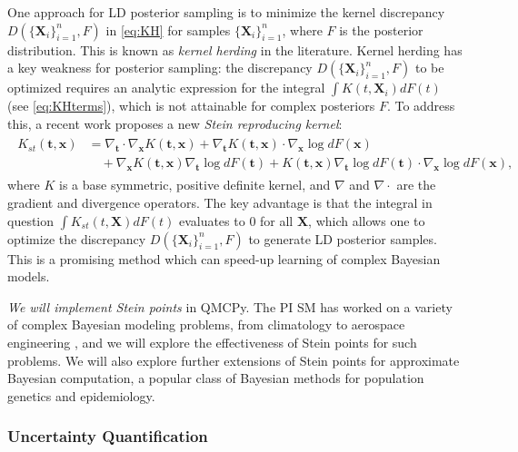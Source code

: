 \documentclass[11pt]{NSFamsart}
\newcommand{\bt}{{\boldsymbol{t}}}
\newcommand{\bx}{{\boldsymbol{x}}}
\newcommand{\bX}{{\boldsymbol{X}}}
\begin{document}
One approach for LD posterior sampling is to minimize the kernel discrepancy $D(\{\bX_i\}_{i=1}^n, F)$ in \eqref{eq:KH} for samples $\{\bX_i\}_{i=1}^n$, where $F$ is the posterior distribution. This is known as \textit{kernel herding} \citep{chen2012super} in the literature. Kernel herding has a key weakness for posterior sampling: the discrepancy $D(\{\bX_i\}_{i=1}^n, F)$ to be optimized requires an analytic expression for the integral $\int K(t,\bX_i) dF(t)$ (see \eqref{eq:KHterms}), which is not attainable for complex posteriors $F$. To address this, a recent work \cite{chen2018stein} proposes a new \textit{Stein reproducing kernel}:
\begin{align}\begin{split} \label{eq:stein}
K_{st}(\bt,\bx) &= \nabla_\bt \cdot \nabla_\bx K(\bt,\bx) + \nabla_\bt K(\bt,\bx) \cdot \nabla_\bx \log dF(\bx)\\
& \quad + \nabla_\bx K(\bt,\bx) \nabla_\bt \log dF(\bt) + K(\bt,\bx) \nabla_\bt \log dF(\bt) \cdot \nabla_\bx \log dF(\bx),
\end{split}\end{align}
where $K$ is a base symmetric, positive definite kernel, and $\nabla$ and $\nabla \cdot$ are the gradient and divergence operators. The key advantage is that the integral in question $\int K_{st}(t,\bX) dF(t)$ evaluates to 0 for all $\bX$, which allows one to optimize the discrepancy $D(\{\bX_i\}_{i=1}^n, F)$ to generate LD posterior samples. This is a promising method which can speed-up learning of complex Bayesian models.

\textit{We will implement Stein points} in QMCPy. The PI \hypertarget{SMlink}{SM} has worked on a variety of complex Bayesian modeling problems, from climatology \cite{mak2016regional} to aerospace engineering \cite{mak2018efficient,chang2019kernel,yeh2018common}, and we will explore the effectiveness of Stein points for such problems. We will also explore further extensions of Stein points for approximate Bayesian computation, a popular class of Bayesian methods for population genetics and epidemiology.

\subsubsection{Uncertainty Quantification}
\end{document}
